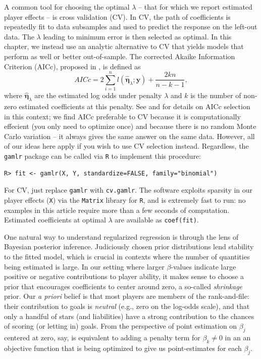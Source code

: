  A common tool for choosing the optimal $\lambda$ -- that for which we report estimated player effects -- is cross validation (CV).  In CV, the path of coefficients is repeatedly fit to data subsamples and used to predict the response on the left-out data. The $\lambda$ leading to minimum error is then selected as optimal.  In this chapter, we instead use an analytic alternative to CV that yields models that perform as well or better out-of-sample.   The corrected Akaike Information Criterion (AICc), proposed in \cite{hurvich_regression_1989}, is defined as
\begin{equation*}
AICc = 2\sum_{i=1}^{n} l(\boldsymbol{\hat\eta}_{\lambda};\mathbf{y}) + \frac{2kn}{n-k-1},
\end{equation*}
where $\boldsymbol{\hat\eta}_{\lambda}$ are the estimated log odds under penalty $\lambda$ and $k$ is the number of non-zero estimated coefficients at this penalty. See \cite{taddy_one-step_2015} and \cite{flynn_efficiency_2013} for details on AICc selection in this context; we find AICc preferable to CV because it is computationally effecient (you only need to optimize once) and because there is no random Monte Carlo variation -- it always gives the same answer on the same data.  However, all of our ideas here apply if you wish to use CV selection instead. Regardless, the {\tt gamlr} package \cite{gamlr} can be called via {\tt R} to implement this procedure:
\begin{verbatim}
R> fit <- gamlr(X, Y, standardize=FALSE, family="binomial")
\end{verbatim}
For CV, just replace \verb!gamlr! with \verb!cv.gamlr!. The software exploits sparsity in our player effects (\verb!X!) via the \verb!Matrix! library for \verb!R!, and is extremely fast to run: no examples in this article require more than a few seconds of computation. Estimated coefficients at optimal $\lambda$ are available as \verb!coef(fit)!.


One natural way to understand regularized regression is through the lens of
Bayesian posterior inference. Judiciously chosen prior distributions lend
stability to the fitted model, which is crucial in contexts where the number
of quantities being estimated is large. In our setting where larger
$\beta$-values indicate large positive or negative contributions to player
ability, it makes sense to choose a prior that encourages coefficients to
center around zero, a so-called {\em shrinkage} prior.  Our {\em a priori}
belief is that most players are members of the rank-and-file: their
contribution to goals is {\em neutral} (e.g., zero on the log-odds scale), and
that only a handful of stars (and liabilities) have a strong contribution to
the chances of scoring (or letting in) goals.  From the perspective of point
estimation on $\beta_j$ centered at zero, say, is equivalent to adding a
penalty term for $\beta_k \ne 0$ in an an objective function that is being
optimized to give us point-estimates for each $\beta_j$.

